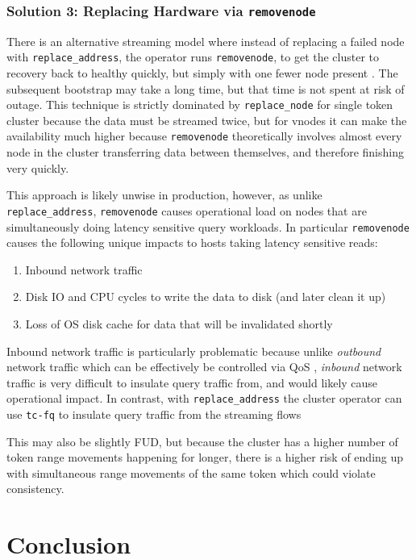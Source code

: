 \documentclass{article}
\begin{document}
\subsubsection{Solution 3: Replacing Hardware via \texttt{removenode}}
\label{sec:replacing}
There is an alternative streaming model where instead of replacing a
failed node with \texttt{replace\_address}, the operator runs
\texttt{removenode}, to get the cluster to recovery back to healthy
quickly, but simply with one fewer node present \cite{removenode}.
The subsequent bootstrap may take a long time, but that time is not
spent at risk of outage. This technique is strictly dominated by
\texttt{replace\_node} for single token cluster because the data must
be streamed twice, but for vnodes it can make the availability much
higher because \texttt{removenode} theoretically involves almost every
node in the cluster transferring data between themselves, and therefore
finishing very quickly.

This approach is likely unwise in production, however, as unlike
\texttt{replace\_address}, \texttt{removenode} causes operational load
on nodes that are simultaneously doing latency sensitive query workloads.
In particular \texttt{removenode} causes the following unique impacts to
hosts taking latency sensitive reads:
\begin{enumerate}
\item{Inbound network traffic}
\item{Disk IO and CPU cycles to write the data to disk (and later clean
it up)}
\item{Loss of OS disk cache for data that will be invalidated shortly}
\end{enumerate}

Inbound network traffic is particularly problematic because unlike
\textit{outbound} network traffic which can be effectively be controlled
via QoS \cite{qos}, \textit{inbound} network traffic is very difficult
to insulate query traffic from, and would likely cause operational impact.
In contrast, with \texttt{replace\_address} the cluster operator can use
\texttt{tc-fq} to insulate query traffic from the streaming flows
\cite{tc-fq}

This may also be slightly FUD, but because the cluster has a higher
number of token range movements happening for longer, there is a higher
risk of ending up with simultaneous range movements of the same token
which could violate consistency.

\section{Conclusion}
\end{document}
